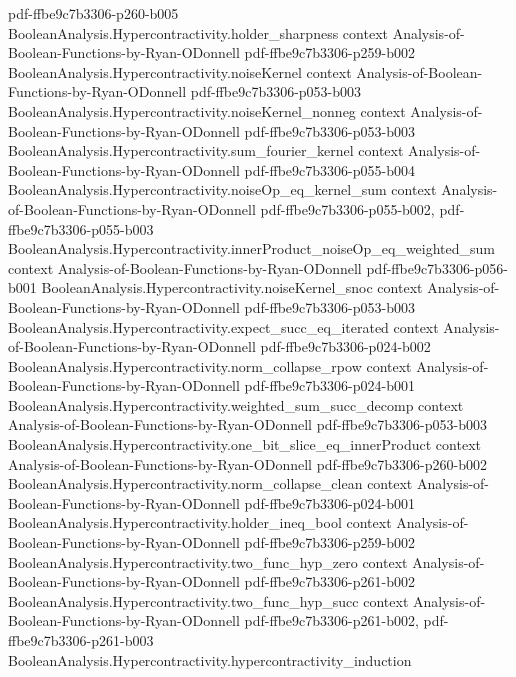 \begin{theorem}
{    pdf-ffbe9c7b3306-p260-b005}
\proofstep
  {BooleanAnalysis.Hypercontractivity.holder_sharpness}
  {context}
  {Analysis-of-Boolean-Functions-by-Ryan-ODonnell}
  {pdf-ffbe9c7b3306-p259-b002}
\proofstep
  {BooleanAnalysis.Hypercontractivity.noiseKernel}
  {context}
  {Analysis-of-Boolean-Functions-by-Ryan-ODonnell}
  {pdf-ffbe9c7b3306-p053-b003}
\proofstep
  {BooleanAnalysis.Hypercontractivity.noiseKernel_nonneg}
  {context}
  {Analysis-of-Boolean-Functions-by-Ryan-ODonnell}
  {pdf-ffbe9c7b3306-p053-b003}
\proofstep
  {BooleanAnalysis.Hypercontractivity.sum_fourier_kernel}
  {context}
  {Analysis-of-Boolean-Functions-by-Ryan-ODonnell}
  {pdf-ffbe9c7b3306-p055-b004}
\proofstep
  {BooleanAnalysis.Hypercontractivity.noiseOp_eq_kernel_sum}
  {context}
  {Analysis-of-Boolean-Functions-by-Ryan-ODonnell}
  {pdf-ffbe9c7b3306-p055-b002,
    pdf-ffbe9c7b3306-p055-b003}
\proofstep
  {BooleanAnalysis.Hypercontractivity.innerProduct_noiseOp_eq_weighted_sum}
  {context}
  {Analysis-of-Boolean-Functions-by-Ryan-ODonnell}
  {pdf-ffbe9c7b3306-p056-b001}
\proofstep
  {BooleanAnalysis.Hypercontractivity.noiseKernel_snoc}
  {context}
  {Analysis-of-Boolean-Functions-by-Ryan-ODonnell}
  {pdf-ffbe9c7b3306-p053-b003}
\proofstep
  {BooleanAnalysis.Hypercontractivity.expect_succ_eq_iterated}
  {context}
  {Analysis-of-Boolean-Functions-by-Ryan-ODonnell}
  {pdf-ffbe9c7b3306-p024-b002}
\proofstep
  {BooleanAnalysis.Hypercontractivity.norm_collapse_rpow}
  {context}
  {Analysis-of-Boolean-Functions-by-Ryan-ODonnell}
  {pdf-ffbe9c7b3306-p024-b001}
\proofstep
  {BooleanAnalysis.Hypercontractivity.weighted_sum_succ_decomp}
  {context}
  {Analysis-of-Boolean-Functions-by-Ryan-ODonnell}
  {pdf-ffbe9c7b3306-p053-b003}
\proofstep
  {BooleanAnalysis.Hypercontractivity.one_bit_slice_eq_innerProduct}
  {context}
  {Analysis-of-Boolean-Functions-by-Ryan-ODonnell}
  {pdf-ffbe9c7b3306-p260-b002}
\proofstep
  {BooleanAnalysis.Hypercontractivity.norm_collapse_clean}
  {context}
  {Analysis-of-Boolean-Functions-by-Ryan-ODonnell}
  {pdf-ffbe9c7b3306-p024-b001}
\proofstep
  {BooleanAnalysis.Hypercontractivity.holder_ineq_bool}
  {context}
  {Analysis-of-Boolean-Functions-by-Ryan-ODonnell}
  {pdf-ffbe9c7b3306-p259-b002}
\proofstep
  {BooleanAnalysis.Hypercontractivity.two_func_hyp_zero}
  {context}
  {Analysis-of-Boolean-Functions-by-Ryan-ODonnell}
  {pdf-ffbe9c7b3306-p261-b002}
\proofstep
  {BooleanAnalysis.Hypercontractivity.two_func_hyp_succ}
  {context}
  {Analysis-of-Boolean-Functions-by-Ryan-ODonnell}
  {pdf-ffbe9c7b3306-p261-b002,
    pdf-ffbe9c7b3306-p261-b003}
\proofstep
  {BooleanAnalysis.Hypercontractivity.hypercontractivity_induction}

\end{theorem}
